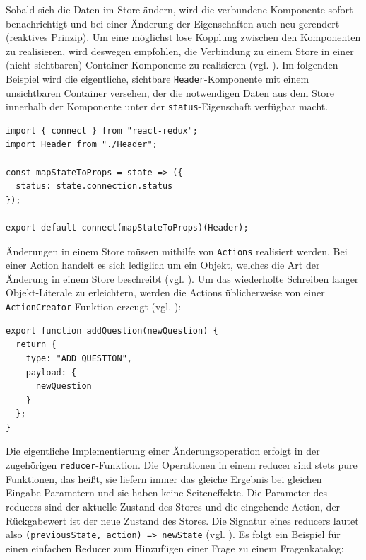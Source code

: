 Sobald sich die Daten im Store ändern, wird die verbundene Komponente sofort benachrichtigt und bei einer Änderung der Eigenschaften auch neu gerendert (reaktives Prinzip). Um eine möglichst lose Kopplung zwischen den Komponenten zu realisieren, wird deswegen empfohlen, die Verbindung zu einem Store in einer (nicht sichtbaren) Container-Komponente zu realisieren (vgl. \cite[Abschnitt „Presentational and Container Components“]{web:redux_react}). Im folgenden Beispiel wird die eigentliche, sichtbare \texttt{Header}-Komponente mit einem unsichtbaren Container versehen, der die notwendigen Daten aus dem Store innerhalb der Komponente unter der \texttt{status}-Eigenschaft verfügbar macht.

\begin{minipage}{\linewidth}
\begin{lstlisting}[caption={Über den connect-Aufruf beim Exportieren der Komponente wird sie mit dem Store verbunden. (aus:  src/client/components/ClientHeaderContainer.js)}]
import { connect } from "react-redux";
import Header from "./Header";

const mapStateToProps = state => ({
  status: state.connection.status
});

export default connect(mapStateToProps)(Header);
\end{lstlisting}
\end{minipage}

Änderungen in einem Store müssen mithilfe von \texttt{Actions} realisiert werden. Bei einer Action handelt es sich lediglich um ein Objekt, welches die Art der Änderung in einem Store beschreibt (vgl. \cite[Abschnitt „Actions“]{web:redux_actions}). Um das wiederholte Schreiben langer Objekt-Literale zu erleichtern, werden die Actions üblicherweise von einer  \texttt{ActionCreator}-Funktion erzeugt (vgl. \cite[Abschnitt „Action Creators“]{web:redux_actions}):

\begin{minipage}{\linewidth}
\begin{lstlisting}[caption={Ein Action-Objekt ist die Beschreibung einer Änderungsoperation und wird in einem ActionCreator erzeugt.}]
export function addQuestion(newQuestion) {
  return {
    type: "ADD_QUESTION",
    payload: {
      newQuestion
    }
  };
}
\end{lstlisting}
\end{minipage}

Die eigentliche Implementierung einer Änderungsoperation erfolgt in der zugehörigen \texttt{reducer}-Funktion. Die Operationen in einem reducer sind stets pure Funktionen, das heißt, sie liefern immer das gleiche Ergebnis bei gleichen Eingabe-Parametern und sie haben keine Seiteneffekte. Die Parameter des reducers sind der aktuelle Zustand des Stores und die eingehende Action, der Rückgabewert ist der neue Zustand des Stores. Die Signatur eines reducers lautet also \texttt{(previousState, action) => newState} (vgl. \cite{web:redux_reducers}). Es folgt ein Beispiel für einen einfachen Reducer zum Hinzufügen einer Frage zu einem Fragenkatalog:

